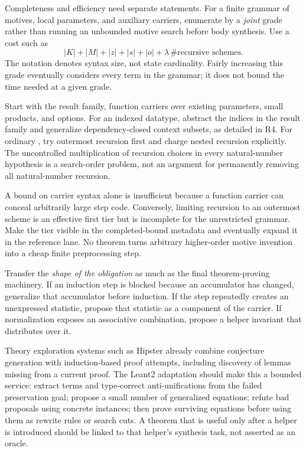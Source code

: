 
\answer Completeness and efficiency need separate statements. For a finite grammar of motives, local parameters, and auxiliary carriers, enumerate by a \emph{joint} grade rather than running an unbounded motive search before body synthesis. Use a cost such as
\[
 |K|+|M|+|z|+|s|+|o|+\lambda\,\#\text{recursive schemes}.
\]
The notation denotes syntax size, not state cardinality. Fairly increasing this grade eventually considers every term in the grammar; it does not bound the time needed at a given grade.

Start with the result family, function carriers over existing parameters, small products, and options. For an indexed datatype, abstract the indices in the result family and generalize dependency-closed context subsets, as detailed in R4. For ordinary , try outermost recursion first and charge nested recursion explicitly. The uncontrolled multiplication of recursion choices in every natural-number hypothesis is a search-order problem, not an argument for permanently removing all natural-number recursion.

A bound on carrier syntax alone is insufficient because a function carrier can conceal arbitrarily large step code. Conversely, limiting recursion to an outermost scheme is an effective first tier but is incomplete for the unrestricted grammar. Make the tier visible in the completed-bound metadata and eventually expand it in the reference lane. No theorem turns arbitrary higher-order motive invention into a cheap finite preprocessing step.


\answer Transfer the \emph{shape of the obligation} as much as the final theorem-proving machinery. If an induction step is blocked because an accumulator has changed, generalize that accumulator before induction. If the step repeatedly creates an unexpressed statistic, propose that statistic as a component of the carrier. If normalization exposes an associative combination, propose a helper invariant that distributes over it.

Theory exploration systems such as Hipster already combine conjecture generation with induction-based proof attempts, including discovery of lemmas missing from a current proof.\cite{hipster} The Leant2 adaptation should make this a bounded service: extract terms and type-correct anti-unifications from the failed preservation goal; propose a small number of generalized equations; refute bad proposals using concrete instances; then prove surviving equations before using them as rewrite rules or search cuts. A theorem that is useful only after a helper is introduced should be linked to that helper's synthesis task, not asserted as an oracle.

